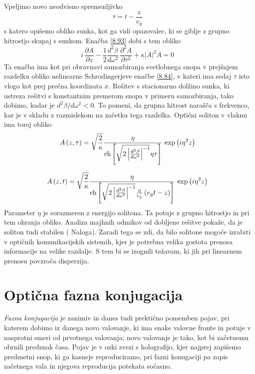 \documentclass[11pt,fleqn]{book} %
\begin{document}
Vpeljimo novo neodvisno spremenljivko 
\begin{equation}
\tau=t-\frac{z}{v_{g}}
\end{equation}
 s katero opišemo obliko sunka, kot ga vidi opazovalec, ki se giblje
z grupno hitrostjo skupaj s sunkom. Enačba \ref{8.93} dobi s tem
obliko 
\begin{equation}
i\,\frac{\partial A}{\partial z}-\frac{1}{2}\frac{d^{2}\beta}{d\omega^{2}}\,\frac{\partial^{2}A}{\partial\tau^{2}}+\kappa\left|A\right|^{2}A=0\label{8.95}
\end{equation}
 Ta enačba ima kot pri obravnavi samozbiranja svetlobnega snopa v
prejšnjem razdelku obliko nelinearne Schrodingerjeve enačbe \ref{8.84},
v kateri ima sedaj $\tau$ isto vlogo kot prej prečna koordinata $x$.
Rešitev s stacionarno dolžino sunka, ki ustreza rešitvi s konstantnim
premerom snopa v primeru samozbiranja, tako dobimo, kadar je $d^{2}\beta/d\omega^{2}<0$.
To pomeni, da grupna hitrost narašča s frekvenco, kar je v skladu
z razmislekom na začetku tega razdelka. Optični soliton v vlaknu ima
torej obliko 
\[
A\left(z,\tau\right)=\sqrt{\frac{2}{\kappa}}\frac{\eta}{{\rm ch}\left[\sqrt{2\left|\frac{d^{2}\beta}{d\omega^{2}}\right|^{-1}}\eta\tau\right]}\,\exp\left(i\eta^{2}z\right)
\]
 
\begin{equation}
A\left(z,t\right)=\sqrt{\frac{2}{\kappa}}\frac{\eta}{{\rm ch}\left[\sqrt{2\left|\frac{d^{2}\beta}{d\omega^{2}}\right|^{-1}}\frac{\eta}{v_{g}}\left(v_{g}t-z\right)\right]}\,\exp\left(i\eta^{2}z\right)\label{8.96}
\end{equation}
 Parameter $\eta$ je sorazmeren z energijo solitona. Ta potuje z
grupno hitrostjo in pri tem ohranja obliko. Analiza majhnih odmikov
od dobljene rešitve pokaže, da je soliton tudi stabilen ( Naloga).
Zaradi tega se zdi, da bilo solitone mogoče izrabiti v optičnih komunikacijskih
sistemih, kjer je potrebna velika gostota prenosa informacije na velike
razdalje. S tem bi se izognili težavam, ki jih pri linearnem prenosu
povzroča disperzija.


\section{Optična fazna konjugacija}

\textit{Fazna konjugacija} je zanimiv in danes tudi prektično pomemben
pojav, pri katerem dobimo iz danega novo valovanje, ki ima enake valovne
fronte in potuje v nasprotni smeri od prvotnega valovanja; novo valovanje
je tako, kot bi začetnemu obrnili predznak časa. Pojav je v ozki zvezi
s holografijo, kjer najprej zapišemo predmetni snop, ki ga kasneje
reproduciramo, pri fazni konugaciji pa zapis začetnega vala in njegova
reproducija potekata sočasno.
\end{document}
